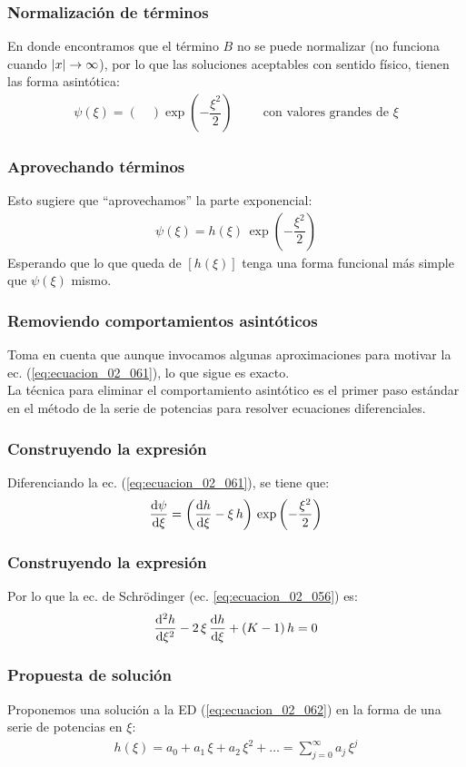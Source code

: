 \documentclass[12pt]{beamer}
\begin{document}
\begin{frame}
\frametitle{Normalización de términos}
En donde encontramos que el término $B$ no se puede normalizar (no funciona cuando $\abs{x} \to \infty$), por lo que las soluciones aceptables con sentido físico, tienen las forma asintótica:
\pause
\begin{align}
\psi (\xi) = ( \quad ) \exp \left( - \dfrac{\xi^{2}}{2} \right) \hspace{1cm} \text{con valores grandes de } \xi
    \label{eq:ecuacion_02_060}
\end{align}
\end{frame}
\begin{frame}
\frametitle{Aprovechando términos}
Esto sugiere que \enquote{aprovechamos} la parte exponencial:
\pause
\begin{align}
    \psi (\xi) = h (\xi) \, \exp \left( - \dfrac{\xi^{2}}{2} \right)
    \label{eq:ecuacion_02_061}
\end{align}
Esperando que lo que queda de $[h (\xi)]$ tenga una forma funcional más simple que $\psi (\xi)$ mismo.
\end{frame}
\begin{frame}
\frametitle{Removiendo comportamientos asintóticos}
Toma en cuenta que aunque invocamos algunas aproximaciones para motivar la ec. (\ref{eq:ecuacion_02_061}), lo que sigue es exacto.
\\
\bigskip
\pause
La técnica para eliminar el comportamiento asintótico es el primer paso estándar en el método de la serie de potencias para resolver ecuaciones diferenciales.
\end{frame}
\begin{frame}
\frametitle{Construyendo la expresión}
Diferenciando la ec. (\ref{eq:ecuacion_02_061}), se tiene que:
\pause
\begin{align*}
    \dv{\psi}{\xi} = \left( \dv{h}{\xi} - \xi \, h \right) \, \exp \left( - \dfrac{\xi^{2}}{2} \right)
\end{align*}
\end{frame}
\begin{frame}
\frametitle{Construyendo la expresión}
Por lo que la ec. de Schrödinger (ec. \ref{eq:ecuacion_02_056}) es:
\pause
\begin{align}
    \dv[2]{h}{\xi} - 2 \, \xi \, \dv{h}{\xi} +  (K - 1) \, h = 0
    \label{eq:ecuacion_02_062}
\end{align}
\end{frame}
\begin{frame}
\frametitle{Propuesta de solución}
Proponemos una solución a la ED (\ref{eq:ecuacion_02_062}) en la forma de una serie de potencias en $\xi$:
\begin{align}
    h (\xi) = a_{0} + a_{1} \, \xi + a_{2} \, \xi^{2} + \ldots = \sum_{j=0}^{\infty} a_{j} \, \xi^{j}
    \label{eq:ecuacion_02_063}
\end{align}
\end{frame}
\end{document}
